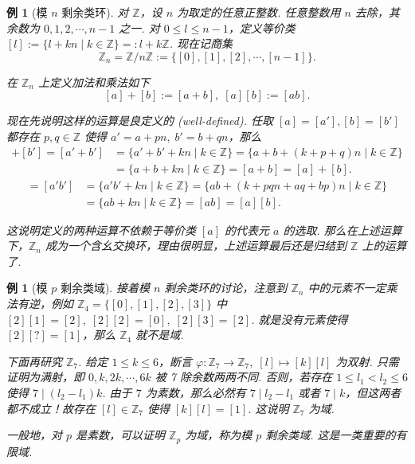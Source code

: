 \documentclass[10pt,openany]{article}
\theoremstyle{thmstyle} %
\theoremstyle{defstyle} %
\theoremstyle{prostyle} %
\newtheorem{example}[theorem]{例}
\begin{document}
\begin{example}[模 \( n \) 剩余类环]
	对 \( \mathbb{Z} \)，设 \( n \) 为取定的任意正整数. 任意整数用 \( n \) 去除，其余数为 \( 0,1,2,\cdots,n-1 \) 之一. 对 \( 0 \leq l \leq n-1 \)，定义等价类 \( [l]:=\{l+kn\mid k \in \mathbb{Z}\}=:l+k\mathbb{Z} \). 现在记商集
	\[ \mathbb{Z}_n=\mathbb{Z}/n\mathbb{Z}:=\{ [0],[1],[2],\cdots,[n-1]\}. \]
	
	在 \( \mathbb{Z}_n \) 上定义加法和乘法如下
	\[ [a]+[b]:=[a+b], \; [a][b]:=[ab]. \]
	
	现在先说明这样的运算是良定义的 (well-defined). 任取 \( [a]=[a'], [b]=[b']  \) 都存在 \( p,q \in \mathbb{Z} \) 使得 \( a'=a+pn, \; b'=b+qn \)，那么
	\begin{align*}
	[a']+[b']=[a'+b'] &=\{a'+b'+kn \mid k \in \mathbb{Z} \}=\{a+b+(k+p+q)n \mid k \in \mathbb{Z} \} \\
	&=\{a+b+kn \mid k \in \mathbb{Z} \}=[a+b]=[a]+[b].
	\end{align*}
	\begin{align*}
		[a'][b']=[a'b'] &=\{a'b'+kn \mid k \in \mathbb{Z} \}=\{ab+(k+pqn+aq+bp)n \mid k \in \mathbb{Z} \} \\
		&=\{ab+kn \mid k \in \mathbb{Z} \}=[ab]=[a][b].
	\end{align*}

	
	这说明定义的两种运算不依赖于等价类 \( [a] \) 的代表元 \( a \) 的选取. 那么在上述运算下，\( \mathbb{Z}_n \) 成为一个含幺交换环，理由很明显，上述运算最后还是归结到 \( \mathbb{Z} \) 上的运算了.
\end{example}

\begin{example}[模 \( p \) 剩余类域]
	接着模 \( n \) 剩余类环的讨论，注意到 \( \mathbb{Z}_n \) 中的元素不一定乘法有逆，例如 \( \mathbb{Z}_4=\{[0],[1],[2],[3]\} \) 中 \( [2][1]=[2], \; [2][2]=[0], \; [2][3]=[2] \). 就是没有元素使得 \( [2][?]=[1] \)，那么 \( \mathbb{Z}_4 \) 就不是域.
	 
	\vspace{1ex}
	
	下面再研究 \( \mathbb{Z}_7 \). 给定 \( 1 \leq k \leq 6  \)，断言 \( \varphi: \mathbb{Z}_7 \to \mathbb{Z}_7, \; [l] \mapsto [k][l] \) 为双射. 只需证明为满射，即 \( 0,k,2k,\cdots,6k \) 被 7 除余数两两不同. 否则，若存在 \( 1 \leq l_1 < l_2 \leq 6 \) 使得 \( 7 \mid (l_2-l_1)k \). 由于 \( 7 \) 为素数，那么必然有 \( 7 \mid l_2-l_1 \) 或者 \( 7 \mid k \)，但这两者都不成立！故存在 \( [l] \in \mathbb{Z}_7 \) 使得 \( [k][l]=[1] \). 这说明 \( \mathbb{Z}_7 \) 为域.
	
	\vspace{1ex}
	
	一般地，对 \( p \) 是素数，可以证明 \( \mathbb{Z}_p \) 为域，称为模 \( p \) 剩余类域. 这是一类重要的有限域. 
\end{example}
\end{document}
